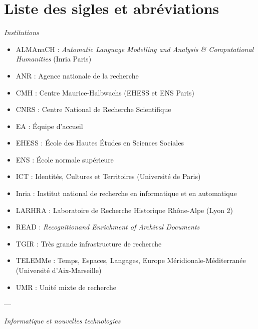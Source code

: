 \chapter*{Liste des sigles et abréviations}

\begin{center}
\textit{Institutions}
\end{center} 

\begin{itemize}
    \item ALMAnaCH : \textit{Automatic Language Modelling and Analysis \& Computational Humanities} (Inria Paris)
    \item ANR : Agence nationale de la recherche
    \item CMH : Centre Maurice-Halbwachs (EHESS et ENS Paris)
    \item CNRS : Centre National de Recherche Scientifique
    \item EA : Équipe d'accueil
    \item EHESS : École des Hautes Études en Sciences Sociales
    \item ENS : École normale supérieure
    \item ICT : Identités, Cultures et Territoires (Université de Paris)
    \item Inria : Institut national de recherche en informatique et en automatique
    \item LARHRA : Laboratoire de Recherche Historique Rhône-Alpe (Lyon 2)
    \item READ : \textit{Recognitionand Enrichment of Archival Documents}
    \item TGIR : Très grande infrastructure de recherche
    \item TELEMMe : Temps, Espaces, Langages, Europe Méridionale-Méditerranée (Université d’Aix-Marseille)
    \item UMR : Unité mixte de recherche
\end{itemize}

\bigbreak

\begin{center}---

\bigbreak

\textit{Informatique et nouvelles technologies}
\end{center} 

\bigbreak

